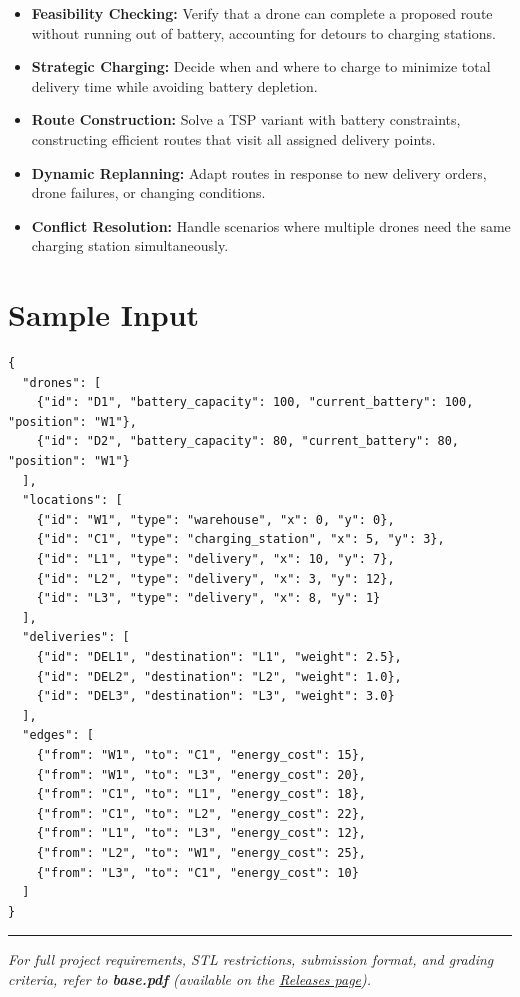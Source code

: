 \begin{itemize}
  \item \textbf{Feasibility Checking:} Verify that a drone can complete a proposed route without running out of battery, accounting for detours to charging stations.
  \item \textbf{Strategic Charging:} Decide when and where to charge to minimize total delivery time while avoiding battery depletion.
  \item \textbf{Route Construction:} Solve a TSP variant with battery constraints, constructing efficient routes that visit all assigned delivery points.
  \item \textbf{Dynamic Replanning:} Adapt routes in response to new delivery orders, drone failures, or changing conditions.
  \item \textbf{Conflict Resolution:} Handle scenarios where multiple drones need the same charging station simultaneously.
\end{itemize}

\section{Sample Input}

\begin{lstlisting}[style=json, caption={data/input\_sample.json}]
{
  "drones": [
    {"id": "D1", "battery_capacity": 100, "current_battery": 100, "position": "W1"},
    {"id": "D2", "battery_capacity": 80, "current_battery": 80, "position": "W1"}
  ],
  "locations": [
    {"id": "W1", "type": "warehouse", "x": 0, "y": 0},
    {"id": "C1", "type": "charging_station", "x": 5, "y": 3},
    {"id": "L1", "type": "delivery", "x": 10, "y": 7},
    {"id": "L2", "type": "delivery", "x": 3, "y": 12},
    {"id": "L3", "type": "delivery", "x": 8, "y": 1}
  ],
  "deliveries": [
    {"id": "DEL1", "destination": "L1", "weight": 2.5},
    {"id": "DEL2", "destination": "L2", "weight": 1.0},
    {"id": "DEL3", "destination": "L3", "weight": 3.0}
  ],
  "edges": [
    {"from": "W1", "to": "C1", "energy_cost": 15},
    {"from": "W1", "to": "L3", "energy_cost": 20},
    {"from": "C1", "to": "L1", "energy_cost": 18},
    {"from": "C1", "to": "L2", "energy_cost": 22},
    {"from": "L1", "to": "L3", "energy_cost": 12},
    {"from": "L2", "to": "W1", "energy_cost": 25},
    {"from": "L3", "to": "C1", "energy_cost": 10}
  ]
}
\end{lstlisting}

\vfill
\noindent\rule{\textwidth}{0.4pt}
{\small\textit{For full project requirements, STL restrictions, submission format, and grading criteria, refer to \textbf{base.pdf} (available on the \href{https://github.com/BestSithInEU/cse211-term-projects/releases}{Releases page}).}}
